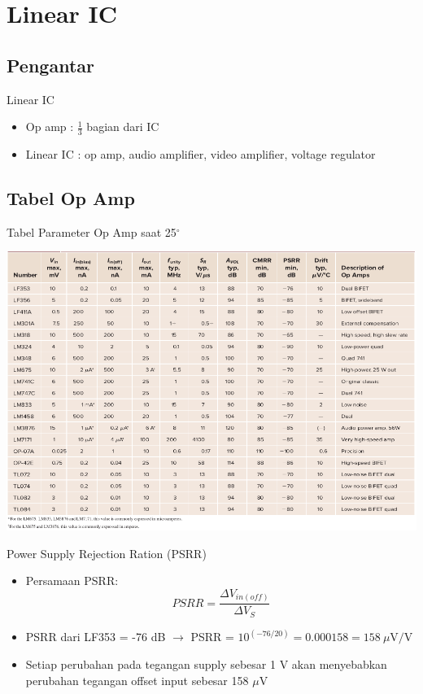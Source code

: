 \section{Linear IC}

\subsection{Pengantar}
\begin{frame}{Linear IC}
	\begin{itemize}
		\item Op amp : $\frac{1}{3}$ bagian dari IC
		\item Linear IC : op amp, audio amplifier, video amplifier, voltage regulator
	\end{itemize}
\end{frame}

\subsection{Tabel Op Amp}
\begin{frame}{Tabel Parameter Op Amp saat 25$^{\circ}$}
	\begin{center}
		\includegraphics[height=0.8\textheight]{gambar/table-16.3}
	\end{center}
\end{frame}

\begin{frame}{Power Supply Rejection Ration (PSRR)}
	\begin{itemize}
		\item Persamaan PSRR:
			\begin{equation}\label{pers.16.17}
				PSRR = \frac{\Delta V_{in(off)}}{\Delta V_S}
			\end{equation}
		\item PSRR dari LF353 = -76 dB $ \rightarrow $ PSRR = $ 10^(-76/20) = 0.000158 = 158 ~\mu\text{V}/\text{V}$
		\item Setiap perubahan pada tegangan supply sebesar 1 V akan menyebabkan perubahan tegangan offset input sebesar 158 $ \mu $V
	\end{itemize}
\end{frame}


